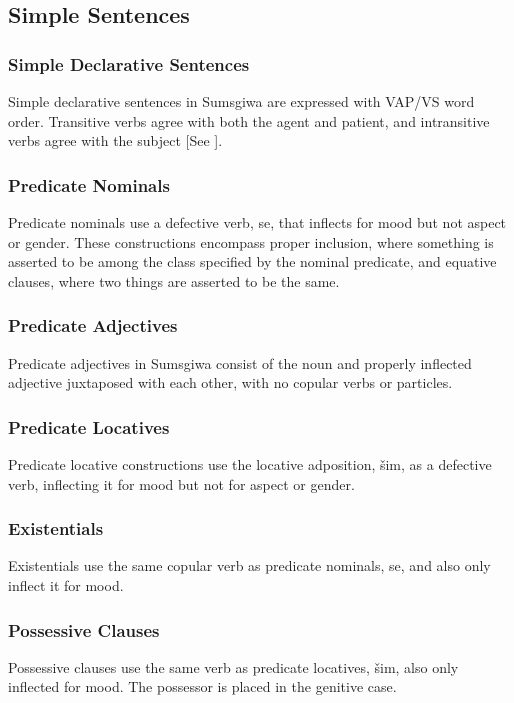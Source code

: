 \subsection{Simple Sentences}

\subsubsection{Simple Declarative Sentences}
Simple declarative sentences in Sumsgiwa are expressed with VAP/VS word order. Transitive verbs agree with both the agent and patient, and intransitive verbs agree with the subject [See ].

\subsubsection{Predicate Nominals} \label{04_05_02_Predicate Nominals}
Predicate nominals use a defective  verb, \textlangle se\textrangle, that inflects for mood but not aspect or gender. These constructions encompass proper inclusion, where something is asserted to be among the class specified by the nominal predicate, and equative clauses, where two things are asserted to be the same.

\subsubsection{Predicate Adjectives}
Predicate adjectives in Sumsgiwa consist of the noun and properly inflected adjective juxtaposed with each other, with no copular verbs or particles.

\subsubsection{Predicate Locatives}
Predicate locative constructions use the locative adposition, \textlangle šim\textrangle, as a defective verb, inflecting it for mood but not for aspect or gender.

\subsubsection{Existentials}
Existentials use the same copular verb as predicate nominals, \textlangle se\textrangle, and also only inflect it for mood.

\subsubsection{Possessive Clauses}
Possessive clauses use the same verb as predicate locatives, \textlangle šim\textrangle, also only inflected for mood. The possessor is placed in the genitive case.
